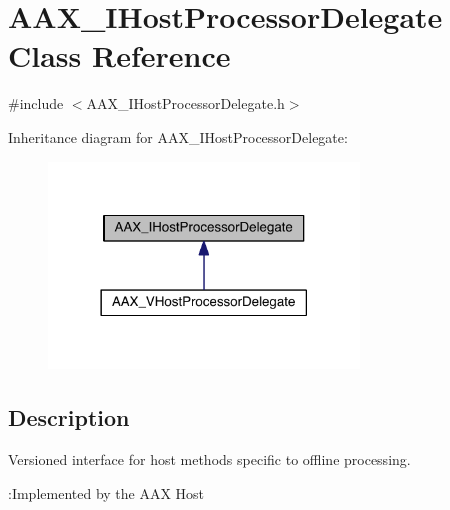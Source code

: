 \hypertarget{a00102}{}\section{A\+A\+X\+\_\+\+I\+Host\+Processor\+Delegate Class Reference}
\label{a00102}


{\ttfamily \#include $<$A\+A\+X\+\_\+\+I\+Host\+Processor\+Delegate.\+h$>$}



Inheritance diagram for A\+A\+X\+\_\+\+I\+Host\+Processor\+Delegate\+:
\nopagebreak
\begin{figure}[H]
\begin{center}
\leavevmode
\includegraphics[width=234pt]{a00638}
\end{center}
\end{figure}


\subsection{Description}
Versioned interface for host methods specific to offline processing. 

\begin{DoxyRefDesc}{\+:\+Implemented by the A\+A\+X Host}
\item[\hyperlink{a00001__aax_host_implementation000007}{\+:\+Implemented by the A\+A\+X Host}]\end{DoxyRefDesc}



